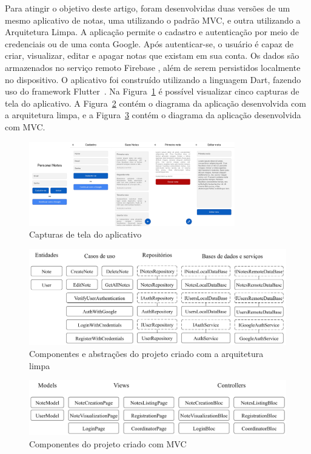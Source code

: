 Para atingir o objetivo deste artigo, foram desenvolvidas duas versões de um mesmo aplicativo de notas, uma utilizando o padrão MVC, e outra utilizando a Arquitetura Limpa.
A aplicação permite o cadastro e autenticação por meio de credenciais ou de uma conta Google.
Após autenticar-se, o usuário é capaz de criar, visualizar, editar e apagar notas que existam em sua conta.
Os dados são armazenados no serviço remoto Firebase \cite{firebase}, além de serem persistidos localmente no dispositivo.
O aplicativo foi construído utilizando a linguagem Dart, fazendo uso do framework Flutter~\cite{flutter}.
Na Figura~\ref{fig:screenshots} é possível visualizar cinco capturas de tela do aplicativo.
A Figura~\ref{fig:project_clean_arch} contém o diagrama da aplicação desenvolvida com a arquitetura limpa, e a Figura~\ref{fig:project_mvc} contém o diagrama da aplicação desenvolvida com MVC.

\begin{figure}[ht]
	\centering
	\includegraphics[width=0.8\textwidth]{images/screenshots.png}
	\caption{Capturas de tela do aplicativo}
	\label{fig:screenshots}
\end{figure}

\begin{figure}[ht]
	\centering
	\includegraphics[width=1\textwidth]{images/project_clean_arch.png}
	\caption{Componentes e abstrações do projeto criado com a arquitetura limpa}
	\label{fig:project_clean_arch}
\end{figure}

\begin{figure}[ht]
	\centering
	\includegraphics[width=1\textwidth]{images/project_mvc.png}
	\caption{Componentes do projeto criado com MVC}
	\label{fig:project_mvc}
\end{figure}